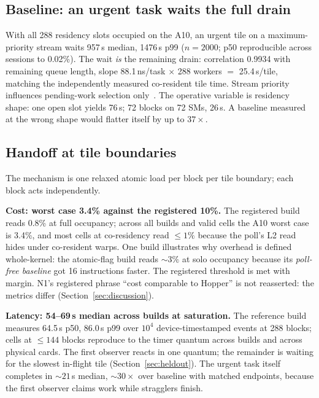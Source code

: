 \documentclass[11pt]{article}
\newcommand{\us}{\,\textmu s\xspace}
\begin{document}
\subsection{Baseline: an urgent task waits the full drain}
\label{sec:baseline}

With all 288 residency slots occupied on the A10, an urgent tile on a
maximum-priority stream waits 957\us{} median, 1476\us{} p99
($n{=}2000$; p50 reproducible across sessions to 0.02\%). The wait
\emph{is} the remaining drain: correlation 0.9934 with remaining
queue length, slope 88.1\,ns/task $\times$ 288 workers $=$
25.4\us/tile, matching the independently measured co-resident tile
time. Stream priority influences pending-work selection
only~\cite{cudart}. The operative variable is residency shape: one
open slot yields 76\us; 72 blocks on 72 SMs, 26\us. A baseline
measured at the wrong shape would flatter itself by up to
$37\times$.

\subsection{Handoff at tile boundaries}
\label{sec:boundary}

The mechanism is one relaxed atomic load per block per tile boundary;
each block acts independently.

\textbf{Cost: worst case 3.4\% against the registered 10\%.} The
registered build reads 0.8\% at full occupancy; across all builds and
valid cells the A10 worst case is 3.4\%, and most cells at
co-residency read ${\le}1\%$ because the poll's L2 read hides under
co-resident warps. One build illustrates why overhead is defined
whole-kernel: the atomic-flag build reads ${\sim}3\%$ at solo
occupancy because its \emph{poll-free baseline} got 16 instructions
faster. The registered threshold is met with margin. N1's registered
phrase ``cost comparable to Hopper'' is not reasserted: the metrics
differ (Section~\ref{sec:discussion}).

\textbf{Latency: 54--69\us{} median across builds at saturation.}
The reference build measures 64.5\us{} p50, 86.0\us{} p99 over $10^4$
device-timestamped events at 288 blocks; cells at ${\le}144$ blocks
reproduce to the timer quantum across builds and across physical
cards. The first observer reacts in one quantum; the remainder is
waiting for the slowest in-flight tile
(Section~\ref{sec:heldout}). The urgent task itself completes in
${\sim}21$\us{} median, ${\sim}30\times$ over baseline with matched
endpoints, because the first observer claims work while stragglers
finish.
\end{document}
